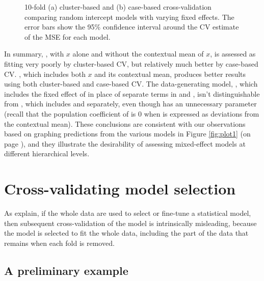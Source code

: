 \documentclass[
]{jss}
\begin{document}
\begin{CodeChunk}
\begin{figure}
{}

\caption[10-fold (a) cluster-based and (b) case-based cross-validation comparing random intercept models with varying fixed effects]{10-fold (a) cluster-based and (b) case-based cross-validation comparing random intercept models with varying fixed effects. The error bars show the 95\% confidence interval around the CV estimate of the MSE for each model.}\label{fig:cross-validation-clusters}
\end{figure}
\end{CodeChunk}

In summary, , with \(x\) alone and without the contextual
mean of \(x\), is assessed as fitting very poorly by cluster-based CV,
but relatively much better by case-based CV. , which
includes both \(x\) and its contextual mean, produces better results
using both cluster-based and case-based CV. The data-generating model,
, which includes the fixed effect of  in place
of separate terms in  and , isn't distinguishable from
, which includes  and  separately, even
though  has an unnecessary parameter (recall that the
population coefficient of  is 0 when  is expressed as
deviations from the contextual mean). These conclusions are consistent
with our observations based on graphing predictions from the various
models in Figure \ref{fig:plot1} (on page \pageref{fig:plot1}), and they
illustrate the desirability of assessing mixed-effect models at
different hierarchical levels.

\hypertarget{cross-validating-model-selection}{%
\section{Cross-validating model
selection}\label{cross-validating-model-selection}}

As \citet[Sec. 7.10.2: ``The Wrong and Right Way to Do
Cross-validation'']{HastieTibshiraniFriedman:2009} explain, if the whole
data are used to select or fine-tune a statistical model, then
subsequent cross-validation of the model is intrinsically misleading,
because the model is selected to fit the whole data, including the part
of the data that remains when each fold is removed.

\hypertarget{a-preliminary-example}{%
\subsection{A preliminary example}\label{a-preliminary-example}}
\end{document}

